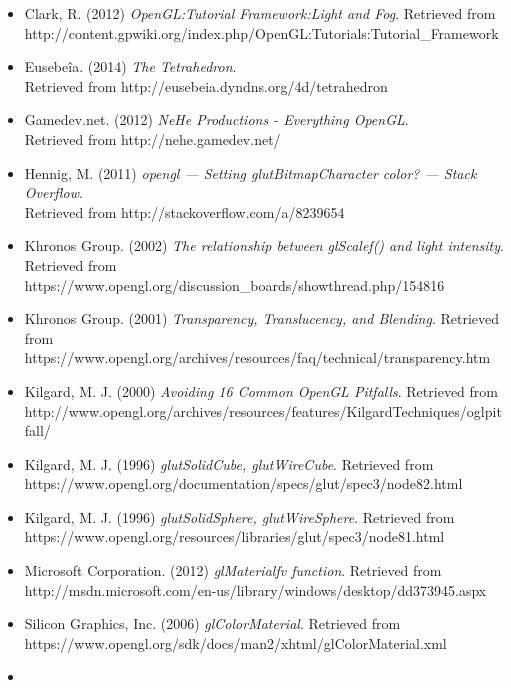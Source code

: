 \documentclass[a4paper,titlepage,12pt]{article}
\begin{document}
\begin{itemize}
\item
Clark, R. (2012)
\textit{OpenGL:Tutorial Framework:Light and Fog}.
Retrieved from \\
http://content.gpwiki.org/index.php/OpenGL:Tutorials:Tutorial\_Framework
\item
Eusebeîa. (2014)
\textit{The Tetrahedron}. \\
Retrieved from
http://eusebeia.dyndns.org/4d/tetrahedron
\item
Gamedev.net. (2012)
\textit{NeHe Productions - Everything OpenGL}. \\
Retrieved from
http://nehe.gamedev.net/
\item
Hennig, M. (2011)
\textit{opengl --- Setting glutBitmapCharacter color? --- Stack Overflow}. \\
Retrieved from
http://stackoverflow.com/a/8239654
\item
Khronos Group. (2002)
\textit{The relationship between glScalef() and light intensity}. \\
Retrieved from
https://www.opengl.org/discussion\_boards/showthread.php/154816
\item
Khronos Group. (2001)
\textit{Transparency, Translucency, and Blending}.
Retrieved from \\
https://www.opengl.org/archives/resources/faq/technical/transparency.htm
\item
Kilgard, M. J. (2000)
\textit{Avoiding 16 Common OpenGL Pitfalls}.
Retrieved from \\
http://www.opengl.org/archives/resources/features/KilgardTechniques/oglpitfall/
\item
Kilgard, M. J. (1996)
\textit{glutSolidCube, glutWireCube}.
Retrieved from \\
https://www.opengl.org/documentation/specs/glut/spec3/node82.html
\item
Kilgard, M. J. (1996)
\textit{glutSolidSphere, glutWireSphere}.
Retrieved from \\
https://www.opengl.org/resources/libraries/glut/spec3/node81.html
\item
Microsoft Corporation. (2012)
\textit{glMaterialfv function}.
Retrieved from \\
http://msdn.microsoft.com/en-us/library/windows/desktop/dd373945.aspx
\item
Silicon Graphics, Inc. (2006)
\textit{glColorMaterial}.
Retrieved from \\
https://www.opengl.org/sdk/docs/man2/xhtml/glColorMaterial.xml
\item

\end{itemize}
\end{document}
